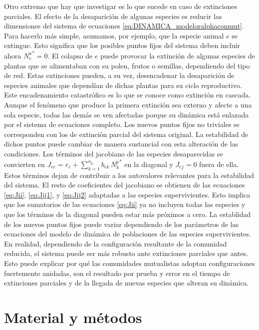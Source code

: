 Otro extremo que hay que investigar es lo que sucede en caso de extinciones parciales. El efecto de la desaparición de algunas especies es reducir las dimensiones del sistema de ecuaciones \ref{eq:DINAMICA_modeloralphaconmut}. Para hacerlo más simple, asumamos, por ejemplo, que la especie animal $e$ se extingue. Esto significa que los posibles puntos fijos del sistema deben incluir ahora ${N_e^a}^* = 0$. El colapso de $e$ puede provocar la extinción de algunas especies de plantas que se alimentaban con su polen, frutos o semillas, dependiendo del tipo de red. Estas extinciones pueden, a su vez, desencadenar la desaparición de especies animales que dependían de dichas plantas para su ciclo reproductivo. Este encadenamiento catastrófico es lo que se conoce como extinción en cascada. Aunque el fenómeno que produce la primera extinción sea externo y afecte a una sola especie, todas las demás se ven afectadas porque su dinámica está enlazada por el sistema de ecuaciones completo. Los nuevos puntos fijos no triviales se corresponden con los de extinción parcial del sistema original. La estabilidad de dichos puntos puede cambiar de manera sustancial con esta alteración de las condiciones. Los términos del jacobiano de las especies desaparecidas se convierten en $J_{ee} = r_e + \sum_{k =1}^{n_p }b_{ek}\,{N_k^p}^*$ en la diagonal y $J_{ej} = 0$ fuera de ella. Estos términos dejan de contribuir a los autovalores relevantes para la estabilidad del sistema. El resto de coeficientes del jacobiano se obtienen de las ecuaciones \ref{eq:Jii}, \ref{eq:Jij1}, y \ref{eq:Jij2} adaptadas a las especies supervivientes. Esto implica que los sumatorios de las ecuaciones \eqref{eq:Jii} ya no incluyen todas las especies y que los términos de la diagonal pueden estar más próximos a cero. La establidad de los nuevos puntos fijos puede variar dependiendo de los parámetros de las ecuaciones del modelo de dinámica de poblaciones de las especies supervivientes. En realidad, dependiendo de la configuración resultante de la comunidad reducida, el sistema puede ser más robusto ante extinciones parciales que antes. Esto puede explicar por qué las comunidades mutualistas adoptan configuraciones fuertemente anidadas, son el resultado por prueba y error en el tiempo de extinciones parciales y de la llegada de nuevas especies que alteran su dinámica.   

\section{Material y métodos}

